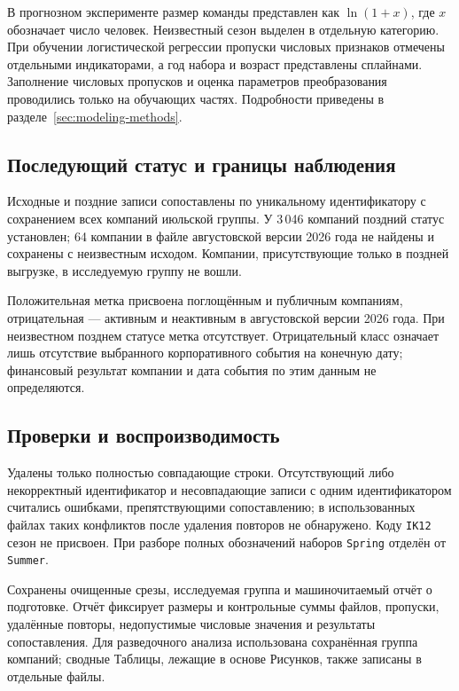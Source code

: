 В прогнозном эксперименте размер команды представлен как $\ln(1+x)$, где $x$ обозначает число человек. Неизвестный сезон выделен в отдельную категорию. При обучении логистической регрессии пропуски числовых признаков отмечены отдельными индикаторами, а год набора и возраст представлены сплайнами. Заполнение числовых пропусков и оценка параметров преобразования проводились только на обучающих частях. Подробности приведены в разделе~\ref{sec:modeling-methods}.

\subsection{Последующий статус и границы наблюдения}

Исходные и поздние записи сопоставлены по уникальному идентификатору с сохранением всех компаний июльской группы. У 3\,046 компаний поздний статус установлен; 64 компании в файле августовской версии 2026 года не найдены и сохранены с неизвестным исходом. Компании, присутствующие только в поздней выгрузке, в исследуемую группу не вошли.

Положительная метка присвоена поглощённым и публичным компаниям, отрицательная --- активным и неактивным в августовской версии 2026 года. При неизвестном позднем статусе метка отсутствует. Отрицательный класс означает лишь отсутствие выбранного корпоративного события на конечную дату; финансовый результат компании и дата события по этим данным не определяются.

\subsection{Проверки и воспроизводимость}

Удалены только полностью совпадающие строки. Отсутствующий либо некорректный идентификатор и несовпадающие записи с одним идентификатором считались ошибками, препятствующими сопоставлению; в использованных файлах таких конфликтов после удаления повторов не обнаружено. Коду \texttt{IK12} сезон не присвоен. При разборе полных обозначений наборов \texttt{Spring} отделён от \texttt{Summer}.

Сохранены очищенные срезы, исследуемая группа и машиночитаемый отчёт о подготовке. Отчёт фиксирует размеры и контрольные суммы файлов, пропуски, удалённые повторы, недопустимые числовые значения и результаты сопоставления. Для разведочного анализа использована сохранённая группа компаний; сводные Таблицы, лежащие в основе Рисунков, также записаны в отдельные файлы.
\clearpage

